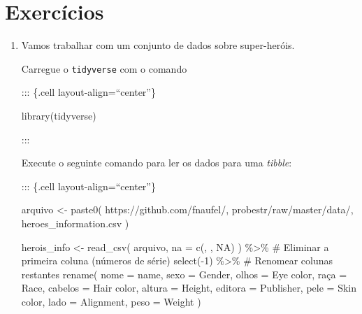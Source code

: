 \documentclass[
  letterpaper,
  DIV=11,
  numbers=noendperiod]{scrreprt}
\newenvironment{Shaded}{\begin{snugshade}}{\end{snugshade}}
\newcommand{\AttributeTok}[1]{\textcolor[rgb]{0.40,0.45,0.13}{#1}}
\newcommand{\CommentTok}[1]{\textcolor[rgb]{0.37,0.37,0.37}{#1}}
\newcommand{\DecValTok}[1]{\textcolor[rgb]{0.68,0.00,0.00}{#1}}
\newcommand{\FunctionTok}[1]{\textcolor[rgb]{0.28,0.35,0.67}{#1}}
\newcommand{\NormalTok}[1]{\textcolor[rgb]{0.00,0.23,0.31}{#1}}
\newcommand{\OtherTok}[1]{\textcolor[rgb]{0.00,0.23,0.31}{#1}}
\newcommand{\SpecialCharTok}[1]{\textcolor[rgb]{0.37,0.37,0.37}{#1}}
\newcommand{\StringTok}[1]{\textcolor[rgb]{0.13,0.47,0.30}{#1}}
\begin{document}
\section{Exercícios}\label{exercuxedcios-1}

\begin{enumerate}
\def\labelenumi{\arabic{enumi}.}
\item
  Vamos trabalhar com um conjunto de dados sobre super-heróis.

  Carregue o \texttt{tidyverse} com o comando

  ::: \{.cell layout-align=``center''\}

\begin{Shaded}
\begin{Highlighting}[]
\FunctionTok{library}\NormalTok{(tidyverse)}
\end{Highlighting}
\end{Shaded}

  :::

  Execute o seguinte comando para ler os dados para uma \emph{tibble}:

  ::: \{.cell layout-align=``center''\}

\begin{Shaded}
\begin{Highlighting}[]
\NormalTok{arquivo }\OtherTok{\textless{}{-}} \FunctionTok{paste0}\NormalTok{(}
  \StringTok{\textquotesingle{}https://github.com/fnaufel/\textquotesingle{}}\NormalTok{,}
  \StringTok{\textquotesingle{}probestr/raw/master/data/\textquotesingle{}}\NormalTok{,}
  \StringTok{\textquotesingle{}heroes\_information.csv\textquotesingle{}}      
\NormalTok{)}

\NormalTok{herois\_info }\OtherTok{\textless{}{-}} \FunctionTok{read\_csv}\NormalTok{(}
\NormalTok{  arquivo,}
  \AttributeTok{na =} \FunctionTok{c}\NormalTok{(}\StringTok{\textquotesingle{}\textquotesingle{}}\NormalTok{, }\StringTok{\textquotesingle{}{-}\textquotesingle{}}\NormalTok{, }\StringTok{\textquotesingle{}NA\textquotesingle{}}\NormalTok{)}
\NormalTok{) }\SpecialCharTok{\%\textgreater{}\%} 
  \CommentTok{\# Eliminar a primeira coluna (números de série)}
  \FunctionTok{select}\NormalTok{(}\SpecialCharTok{{-}}\DecValTok{1}\NormalTok{) }\SpecialCharTok{\%\textgreater{}\%} 
  \CommentTok{\# Renomear colunas restantes}
  \FunctionTok{rename}\NormalTok{(}
    \AttributeTok{nome =}\NormalTok{ name,}
    \AttributeTok{sexo =}\NormalTok{ Gender,}
    \AttributeTok{olhos =} \StringTok{\textquotesingle{}Eye color\textquotesingle{}}\NormalTok{,}
\NormalTok{    raça }\OtherTok{=}\NormalTok{ Race,}
    \AttributeTok{cabelos =} \StringTok{\textquotesingle{}Hair color\textquotesingle{}}\NormalTok{,}
    \AttributeTok{altura =}\NormalTok{ Height,}
    \AttributeTok{editora =}\NormalTok{ Publisher,}
    \AttributeTok{pele =} \StringTok{\textquotesingle{}Skin color\textquotesingle{}}\NormalTok{,}
    \AttributeTok{lado =}\NormalTok{ Alignment,}
    \AttributeTok{peso =}\NormalTok{ Weight}
\NormalTok{  )}
\end{Highlighting}
\end{Shaded}


\end{enumerate}
\end{document}
